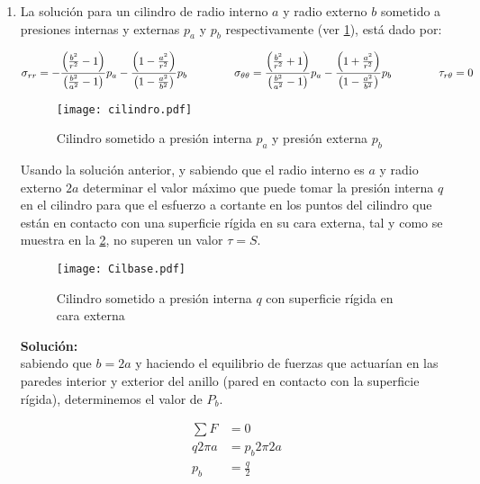 \documentclass[../notas medios.tex]{subfiles}
\begin{document}
\begin{enumerate} 

\item La solución para un cilindro de radio interno $a$ y radio externo $b$ sometido a presiones internas y externas $p_a$ y $p_b$ respectivamente (ver \cref{cilindro}), está dado por:

\begin{equation*}
\sigma _{rr}  =  - \frac{{\left( {\frac{{{b^2}}}{{{r^2}}} - 1} \right)}}{{\left( {\frac{{{b^2}}}{{{a^2}}} - 1} \right)}}{p_a} - \frac{{\left( {1 - \frac{{{a^2}}}{{{r^2}}}} \right)}}{{\left( {1 - \frac{{{a^2}}}{{{b^2}}}} \right)}}{p_b} \hspace{1.5cm}
\sigma _{\theta \theta } = \frac{{\left( {\frac{{{b^2}}}{{{r^2}}} + 1} \right)}}{{\left( {\frac{{{b^2}}}{{{a^2}}} - 1} \right)}}{p_a} - \frac{{\left( {1 + \frac{{{a^2}}}{{{r^2}}}} \right)}}{{\left( {1 - \frac{{{a^2}}}{{{b^2}}}} \right)}}{p_b} \hspace{1.5cm}
\tau _{r\theta} = 0
\label{slnc}
\end{equation*}

\begin{figure}[H]
\centering
	\texttt{[image: cilindro.pdf]}
	\caption{Cilindro sometido a presión interna $p_a$ y presión externa $p_b$}
	\label{cilindro}
\end{figure}
 	
Usando la solución anterior, y sabiendo que el radio interno es $a$ y radio externo $2a$ determinar el valor máximo que puede tomar la  presión interna $q$ en el cilindro para que el esfuerzo a cortante en los puntos del cilindro que están en contacto con una superficie rígida en su cara externa, tal y como se muestra en la \cref{cilbr}, no superen un valor $\tau=S$. 

\begin{figure}[H]
\centering
	\texttt{[image: Cilbase.pdf]}
	\caption{Cilindro sometido a presión interna $q$ con superficie rígida en cara externa}
	\label{cilbr}
\end{figure}
%
\textbf{Solución:} \\
sabiendo  que  $b = 2a$ y haciendo el equilibrio de fuerzas que actuarían en las paredes interior y exterior del anillo (pared en contacto con la superficie rígida),  determinemos el valor de $P_b$. 

\begin{equation*}
\begin{split}
{\sum {F}} & = 0 \\
{q  2\pi a} & =  p_b 2\pi 2a \\
{p_b}   & =  \frac{q}{2}
\end{split}
\label{sln1}
\end{equation*}


\end{enumerate}
\end{document}
